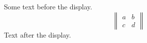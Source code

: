 \documentclass[12pt]{article}
\begin{document}
Some text before the display.
\[ \begin{Vmatrix} a & b \\ c & d \end{Vmatrix} \]
Text after the display.
\end{document}
